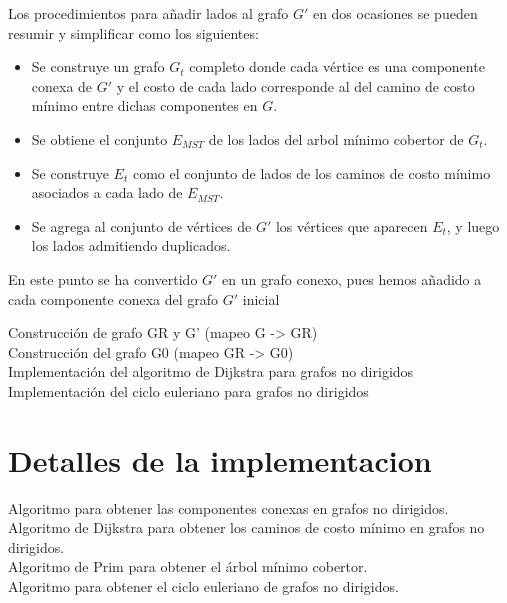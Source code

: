 \documentclass[11pt]{article}
\begin{document}
Los procedimientos para añadir lados al grafo $G'$ en dos ocasiones
se pueden resumir y simplificar como los siguientes:

\begin{itemize}
   \item Se construye un grafo $G_t$ completo donde cada vértice
   es una componente conexa de $G'$ y el costo de cada lado corresponde
   al del camino de costo mínimo entre dichas componentes en $G$.
   
   \item Se obtiene el conjunto $E_{MST}$ de los lados del arbol mínimo
   cobertor de $G_t$.

   \item Se construye $E_t$ como el conjunto de lados de los
   caminos de costo mínimo asociados a cada lado de $E_{MST}$.

   \item Se agrega al conjunto de vértices de $G'$ los
   vértices que aparecen $E_t$, y luego los lados admitiendo
   duplicados.
\end{itemize}

En este punto se ha convertido $G'$ en un grafo conexo, pues
hemos añadido a cada componente conexa del grafo $G'$ inicial


Construcción de grafo GR y G' (mapeo G -> GR) \\

Construcción del grafo G0 (mapeo GR -> G0) \\

Implementación del algoritmo de Dijkstra para grafos no dirigidos\\

Implementación del ciclo euleriano para grafos no dirigidos\\


\section{Detalles de la implementacion}

Algoritmo para obtener las componentes conexas en grafos no dirigidos. \\

Algoritmo de Dijkstra para obtener los caminos de costo mínimo en grafos no dirigidos. \\

Algoritmo de Prim para obtener el árbol mínimo cobertor.\\

Algoritmo para obtener el ciclo euleriano de grafos no dirigidos.\\
\end{document}
